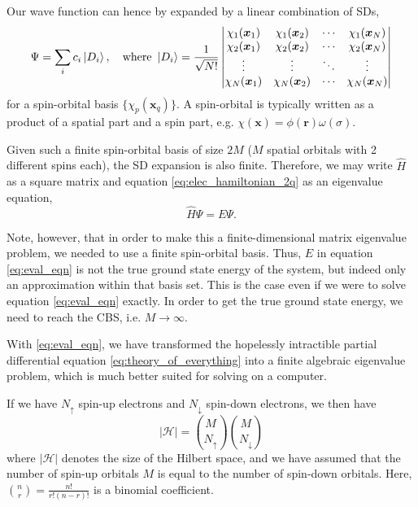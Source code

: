 Our wave function can hence by expanded by a linear combination of \glspl{SD},
\begin{equation}
    \label{eq:SD_expansion}
\Psi = \sum_i c_i \ket{D_i},
\quad \text{where } \ket{D_i} =
\frac 1{\sqrt{N!}}\left|
    \begin{matrix}
        \chi_1(\bm x_1) & \chi_1(\bm x_2) & \cdots & \chi_1(\bm x_N)\\
        \chi_2(\bm x_1) & \chi_2(\bm x_2) & \cdots & \chi_2(\bm x_N)\\
        \vdots & \vdots & \ddots & \vdots\\
        \chi_N(\bm x_1) & \chi_N(\bm x_2) & \cdots & \chi_N(\bm x_N)\\
    \end{matrix}
 \right|
\end{equation}
for a spin-orbital basis $\{\chi_p(\bm x_q)\}$. A spin-orbital is typically written as a product of a spatial part and a spin part, e.g. $\chi(\bm x) = \phi(\bm r)\omega(\sigma)$.

Given such a finite spin-orbital basis of size $2M$ ($M$ spatial orbitals with 2 different spins each), the \gls{SD} expansion is also finite. Therefore, we may write $\hat H$ as a square matrix and equation \eqref{eq:elec_hamiltonian_2q} as an eigenvalue equation,
\begin{equation}
\label{eq:eval_eqn}
\hat H\Psi = E\Psi.
\end{equation}

Note, however, that in order to make this a finite-dimensional matrix eigenvalue problem, we needed to use a finite spin-orbital basis. Thus, $E$ in equation \eqref{eq:eval_eqn} is not the true ground state energy of the system, but indeed only an approximation within that basis set. This is the case even if we were to solve equation \eqref{eq:eval_eqn} exactly. In order to get the true ground state energy, we need to reach the \gls{CBS}, i.e. $M\to\infty$.

With \eqref{eq:eval_eqn}, we have transformed the hopelessly intractible partial differential equation \eqref{eq:theory_of_everything} into a finite algebraic eigenvalue problem, which is much better suited for solving on a computer.

If we have $N_\uparrow$ spin-up electrons and $N_\downarrow$ spin-down electrons, we then have
\begin{equation}
\label{eq:scaling}
|\mathcal{H}| = {M \choose N_\uparrow}{M\choose N_\downarrow}
\end{equation}
where $|\mathcal{H}|$ denotes the size of the Hilbert space, and we have assumed that the number of spin-up orbitals $M$ is equal to the number of spin-down orbitals. Here, ${n\choose r}=\frac{n!}{r!(n-r)!}$ is a binomial coefficient.

